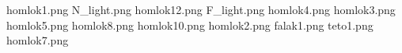homlok1.png
N_light.png
homlok12.png
F_light.png
homlok4.png
homlok3.png
homlok5.png
homlok8.png
homlok10.png
homlok2.png
falak1.png
teto1.png
homlok7.png
